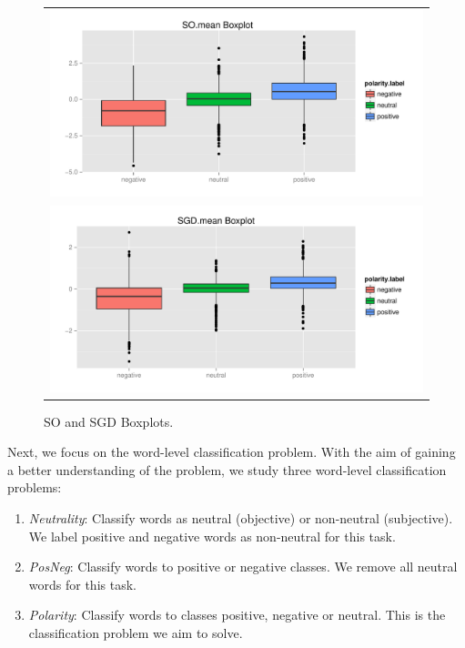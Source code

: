 \documentclass{sig-alternate}
\begin{document}
\begin{figure}[ht]
\begin{center}
\begin{tabular}{c}
\includegraphics[scale=0.45]{SObox.pdf}\\
\includegraphics[scale=0.45]{SGDbox.pdf}
\end{tabular}
\caption{SO and SGD  Boxplots.}
\label{fig:box}
\end{center}
\end{figure} 

 
Next, we focus on the word-level classification problem. With the aim of gaining a better understanding of the problem, we study three word-level classification problems:
\begin{enumerate}
\item  \emph{Neutrality}: Classify words as neutral (objective) or non-neutral (subjective). We label positive and negative words as non-neutral for this task.
\item \emph{PosNeg}: Classify words to positive or negative classes. We remove all neutral words for this task. 
\item \emph{Polarity}: Classify words to classes positive, negative or neutral. This is the classification problem we aim to solve. 
\end{enumerate}
\end{document}
